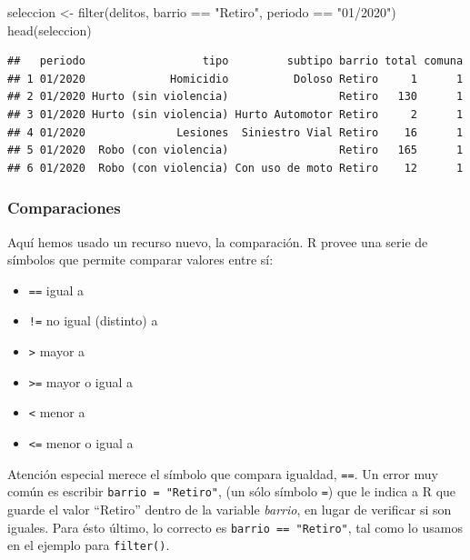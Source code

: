 \documentclass[
]{book}
\newenvironment{Shaded}{\begin{snugshade}}{\end{snugshade}}
\newcommand{\FunctionTok}[1]{\textcolor[rgb]{0.00,0.00,0.00}{#1}}
\newcommand{\NormalTok}[1]{#1}
\newcommand{\OtherTok}[1]{\textcolor[rgb]{0.56,0.35,0.01}{#1}}
\newcommand{\SpecialCharTok}[1]{\textcolor[rgb]{0.00,0.00,0.00}{#1}}
\newcommand{\StringTok}[1]{\textcolor[rgb]{0.31,0.60,0.02}{#1}}
\begin{document}
\begin{Shaded}
\begin{Highlighting}[]
\NormalTok{seleccion }\OtherTok{\textless{}{-}} \FunctionTok{filter}\NormalTok{(delitos, barrio }\SpecialCharTok{==} \StringTok{"Retiro"}\NormalTok{, periodo }\SpecialCharTok{==} \StringTok{"01/2020"}\NormalTok{)}
\FunctionTok{head}\NormalTok{(seleccion)}
\end{Highlighting}
\end{Shaded}

\begin{verbatim}
##   periodo                  tipo         subtipo barrio total comuna
## 1 01/2020             Homicidio          Doloso Retiro     1      1
## 2 01/2020 Hurto (sin violencia)                 Retiro   130      1
## 3 01/2020 Hurto (sin violencia) Hurto Automotor Retiro     2      1
## 4 01/2020              Lesiones  Siniestro Vial Retiro    16      1
## 5 01/2020  Robo (con violencia)                 Retiro   165      1
## 6 01/2020  Robo (con violencia) Con uso de moto Retiro    12      1
\end{verbatim}

\hypertarget{comparaciones}{%
\subsubsection{Comparaciones}\label{comparaciones}}

Aquí hemos usado un recurso nuevo, la comparación. R provee una serie de símbolos que permite comparar valores entre sí:

\begin{itemize}
\item
  \texttt{==} igual a
\item
  \texttt{!=} no igual (distinto) a
\item
  \texttt{\textgreater{}} mayor a
\item
  \texttt{\textgreater{}=} mayor o igual a
\item
  \texttt{\textless{}} menor a
\item
  \texttt{\textless{}=} menor o igual a
\end{itemize}

Atención especial merece el símbolo que compara igualdad, \texttt{==}. Un error muy común es escribir \texttt{barrio\ =\ "Retiro"}, (un sólo símbolo \texttt{=}) que le indica a R que guarde el valor ``Retiro'' dentro de la variable \emph{barrio}, en lugar de verificar si son iguales. Para ésto último, lo correcto es \texttt{barrio\ ==\ "Retiro"}, tal como lo usamos en el ejemplo para \texttt{filter()}.
\end{document}
